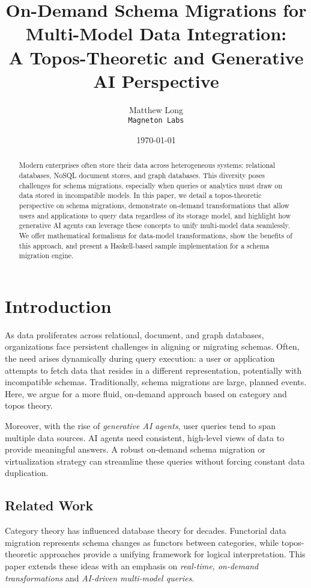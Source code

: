 \documentclass[11pt]{article}
\title{On-Demand Schema Migrations for Multi-Model Data Integration:\\
A Topos-Theoretic and Generative AI Perspective}
\author{Matthew Long \\
\texttt{Magneton Labs}}
\date{\today}
\begin{document}
\maketitle

\begin{abstract}
Modern enterprises often store their data across heterogeneous systems: relational databases, NoSQL document stores, and graph databases. This diversity poses challenges for schema migrations, especially when queries or analytics must draw on data stored in incompatible models. In this paper, we detail a topos-theoretic perspective on schema migrations, demonstrate on-demand transformations that allow users and applications to query data regardless of its storage model, and highlight how generative AI agents can leverage these concepts to unify multi-model data seamlessly. We offer mathematical formalisms for data-model transformations, show the benefits of this approach, and present a Haskell-based sample implementation for a schema migration engine.
\end{abstract}

\section{Introduction}
As data proliferates across relational, document, and graph databases, organizations face persistent challenges in aligning or migrating schemas. Often, the need arises dynamically during query execution: a user or application attempts to fetch data that resides in a different representation, potentially with incompatible schemas. Traditionally, schema migrations are large, planned events. Here, we argue for a more fluid, on-demand approach based on category and topos theory.

Moreover, with the rise of \emph{generative AI agents}, user queries tend to span multiple data sources. AI agents need consistent, high-level views of data to provide meaningful answers. A robust on-demand schema migration or virtualization strategy can streamline these queries without forcing constant data duplication.

\subsection{Related Work}
Category theory has influenced database theory for decades. Functorial data migration \cite{SpivakFQL} represents schema changes as functors between categories, while topos-theoretic approaches \cite{JohnstoneSketches} provide a unifying framework for logical interpretation. This paper extends these ideas with an emphasis on \emph{real-time, on-demand transformations} and \emph{AI-driven multi-model queries}.
\end{document}
